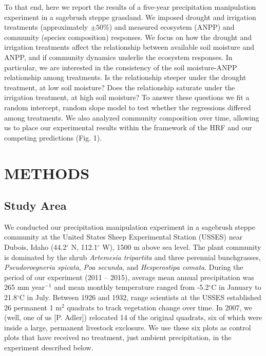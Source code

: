 \documentclass[fleqn,10pt,lineno]{wlpeerj} %
\begin{document}
To that end, here we report the results of a five-year precipitation
manipulation experiment in a sagebrush steppe grassland. We imposed
drought and irrigation treatments (approximately \(\pm50\%\)) and
measured ecosystem (ANPP) and community (species composition) responses.
We focus on how the drought and irrigation treatments affect the
relationship between available soil moisture and ANPP, and if community
dynamics underlie the ecosystem responses. In particular, we are
interested in the consistency of the soil moisture-ANPP relationship
among treatments. Is the relationship steeper under the drought
treatment, at low soil moisture? Does the relationship saturate under
the irrigation treatment, at high soil moisture? To answer these
questions we fit a random intercept, random slope model to test whether
the regressions differed among treatments. We also analyzed community
composition over time, allowing us to place our experimental results
within the framework of the HRF and our competing predictions (Fig. 1).

\section{METHODS}\label{methods}

\subsection{Study Area}\label{study-area}

We conducted our precipitation manipulation experiment in a sagebrush
steppe community at the United States Sheep Experimental Station (USSES)
near Dubois, Idaho (44.2\(^{\circ}\) N, 112.1\(^{\circ}\) W), 1500 m
above sea level. The plant community is dominated by the shrub
\emph{Artemesia tripartita} and three perennial bunchgrasses,
\emph{Pseudoroegneria spicata}, \emph{Poa secunda}, and
\emph{Hesperostipa comata}. During the period of our experiment (2011 --
2015), average mean annual precipitation was 265 mm
year\(\phantom{}^{-1}\) and mean monthly temperature ranged from
-5.2\(^{\circ}\)C in January to 21.8\(^{\circ}\)C in July. Between 1926
and 1932, range scientists at the USSES established 26 permanent 1
m\(^2\) quadrats to track vegetation change over time. In 2007, we
(well, one of us {[}P. Adler{]}) relocated 14 of the original quadrats,
six of which were inside a large, permanent livestock exclosure. We use
these six plots as control plots that have received no treatment, just
ambient precipitation, in the experiment described below.
\end{document}
